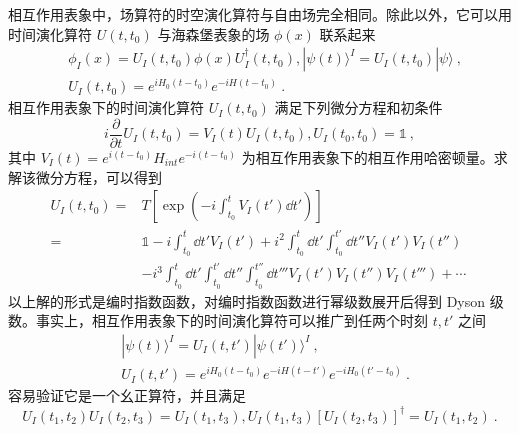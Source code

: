 相互作用表象中，场算符的时空演化算符与自由场完全相同。除此以外，它可以用时间演化算符 $U(t,t_0)$ 与海森堡表象的场 $\phi(x)$ 联系起来
\begin{equation}
\begin{aligned}
&\phi_I(x)=U_I(t,t_0)\phi(x)U_I^\dagger(t,t_0),|\psi(t)\rangle^I=U_I(t,t_0)|\psi\rangle~,\\
&U_I(t,t_0)=e^{iH_0(t-t_0)}e^{-iH(t-t_0)}~.
\end{aligned}
\end{equation}
相互作用表象下的时间演化算符 $U_I(t,t_0)$ 满足下列微分方程和初条件
\begin{equation}
i\frac{\partial}{\partial t}U_I(t,t_0)=V_I(t)U_I(t,t_0), U_I(t_0,t_0)=\mathbb{1}~,
\end{equation}
其中 $V_I(t)=e^{i(t-t_0)}H_{int} e^{-i(t-t_0)}$ 为相互作用表象下的相互作用哈密顿量。求解该微分方程，可以得到
\begin{equation}
\begin{aligned}
U_I(t,t_0)=&T\left[\exp\left(-i\int_{t_0}^{t}V_I(t')\dd t'\right)\right]\\
=&\mathbb{1}-i\int_{t_0}^t \dd t' V_I(t')+i^2\int_{t_0}^t \dd t'  \int_{t_0}^{t'} \dd t'' V_I(t')V_I(t'') \\
 &-i^3\int_{t_0}^t \dd t'  \int_{t_0}^{t'} \dd t'' \int_{t_0}^{t''}\dd t''' V_I(t')V_I(t'')V_I(t''')+\cdots
\end{aligned}~
\end{equation}
以上解的形式是编时指数函数，对编时指数函数进行幂级数展开后得到 Dyson 级数。事实上，相互作用表象下的时间演化算符可以推广到任两个时刻 $t,t'$ 之间
\begin{equation}\label{eq_Ipic_1}
\begin{aligned}
& |\psi(t)\rangle^I=U_I(t,t')|\psi(t')\rangle^I~,\\
& U_I(t,t')=e^{iH_0(t-t_0)}e^{-iH(t-t')}e^{-iH_0(t'-t_0)}~.
\end{aligned}
\end{equation}
容易验证它是一个幺正算符，并且满足
\begin{equation}
U_I(t_1,t_2)U_I(t_2,t_3)=U_I(t_1,t_3), U_I(t_1,t_3)[U_I(t_2,t_3)]^\dagger=U_I(t_1,t_2)~.
\end{equation}

